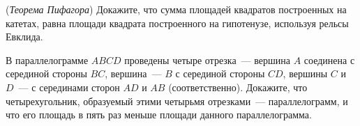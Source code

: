 \begin{problems}

\item (\textit{Теорема Пифагора})
Докажите, что сумма площадей квадратов построенных на катетах, равна площади квадрата построенного на гипотенузе, используя рельсы Евклида.

\item В параллелограмме $ABCD$ проведены четыре отрезка~--- вершина $A$ соединена с серединой стороны $BC$, вершина~--- $B$ с серединой стороны $CD$, вершины $C$ и $D$~--- с серединами сторон $AD$ и $AB$ (соответственно). Докажите, что четырехугольник, образуемый этими четырьмя отрезками~--- параллелограмм, и что его площадь в пять раз меньше площади данного параллелограмма.
\end{problems}

\newpage

